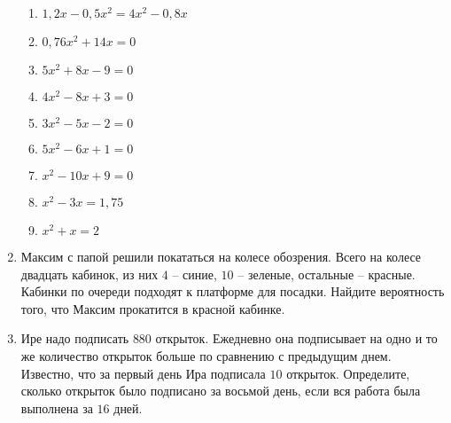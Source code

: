 \documentclass[12pt, a4paper]{article}
\begin{document}
\begin{enumerate}
\begin{multicols}{2}
\begin{enumerate}[label=\asbuk*)]
						\item $1,2x-0,5x^2=4x^2-0,8x$
						\item $0,76x^2+14x=0$
						\item $5x^2+8x-9=0$
						\item $4x^2-8x+3=0$
						\item $3x^2-5x-2=0$
						\item $5x^2-6x+1=0$
						\item $x^2-10x+9=0$
						\item $x^2-3x=1,75$
						\item $x^2+x=2$
					\end{enumerate}
				\end{multicols}
				\item Максим с папой решили покататься на колесе обозрения. Всего на колесе двадцать кабинок, из них $4$ – синие, $10$ – зеленые, остальные – красные. Кабинки по очереди подходят к платформе для посадки. Найдите вероятность того, что Максим прокатится в красной кабинке.
				\item Ире надо подписать $880$ открыток. Ежедневно она подписывает на одно и то же количество открыток больше по сравнению с предыдущим днем. Известно, что за первый день Ира подписала $10$ открыток. Определите, сколько открыток было подписано за восьмой день, если вся работа была выполнена за $16$ дней.
			\end{enumerate}
		
\end{document}
